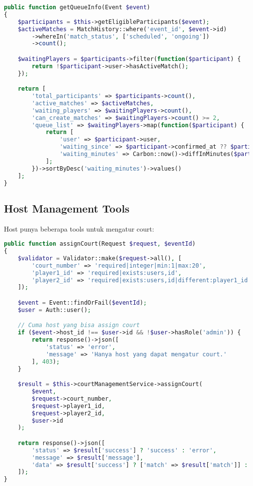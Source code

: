 \documentclass[12pt]{article}
\begin{document}
\begin{lstlisting}[language=PHP, caption=Get Queue Info di MatchmakingService.php]
public function getQueueInfo(Event $event)
{
    $participants = $this->getEligibleParticipants($event);
    $activeMatches = MatchHistory::where('event_id', $event->id)
        ->whereIn('match_status', ['scheduled', 'ongoing'])
        ->count();

    $waitingPlayers = $participants->filter(function($participant) {
        return !$participant->user->hasActiveMatch();
    });

    return [
        'total_participants' => $participants->count(),
        'active_matches' => $activeMatches,
        'waiting_players' => $waitingPlayers->count(),
        'can_create_matches' => $waitingPlayers->count() >= 2,
        'queue_list' => $waitingPlayers->map(function($participant) {
            return [
                'user' => $participant->user,
                'waiting_since' => $participant->confirmed_at ?? $participant->created_at,
                'waiting_minutes' => Carbon::now()->diffInMinutes($participant->confirmed_at ?? $participant->created_at)
            ];
        })->sortByDesc('waiting_minutes')->values()
    ];
}
\end{lstlisting}

\subsection{Host Management Tools}

Host punya beberapa tools untuk mengatur court:

\begin{lstlisting}[language=PHP, caption=Court Assignment di MatchmakingController.php]
public function assignCourt(Request $request, $eventId)
{
    $validator = Validator::make($request->all(), [
        'court_number' => 'required|integer|min:1|max:20',
        'player1_id' => 'required|exists:users,id',
        'player2_id' => 'required|exists:users,id|different:player1_id',
    ]);

    $event = Event::findOrFail($eventId);
    $user = Auth::user();

    // Cuma host yang bisa assign court
    if ($event->host_id !== $user->id && !$user->hasRole('admin')) {
        return response()->json([
            'status' => 'error',
            'message' => 'Hanya host yang dapat mengatur court.'
        ], 403);
    }

    $result = $this->courtManagementService->assignCourt(
        $event,
        $request->court_number,
        $request->player1_id,
        $request->player2_id,
        $user->id
    );

    return response()->json([
        'status' => $result['success'] ? 'success' : 'error',
        'message' => $result['message'],
        'data' => $result['success'] ? ['match' => $result['match']] : null
    ]);
}
\end{lstlisting}
\end{document}

